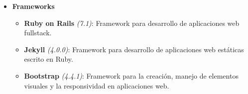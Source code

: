 \begin{itemize}
	\item[] \textbf{Frameworks}
	\begin{itemize}
		\item \textbf{Ruby on Rails} \textit{(7.1)}: Framework para desarrollo de aplicaciones web fullstack.
		\item \textbf{Jekyll} \textit{(4.0.0)}: Framework para desarrollo de aplicaciones web estáticas escrito en Ruby.
		\item \textbf{Bootstrap} \textit{(4.4.1)}: Framework para la creación, manejo de elementos visuales y la responsividad en aplicaciones web.
	\end{itemize}
\end{itemize}
